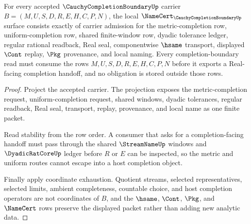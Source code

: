 \begin{theorem}
\label{thm:cauchy-completion-boundary-namecert-obligations}
For every accepted $\CauchyCompletionBoundaryUp$ carrier $B=(M,U,S,D,R,E,H,C,P,N)$, the local $\NameCert_{\CauchyCompletionBoundaryUp}$ surface consists exactly of carrier admission for the metric-completion row, uniform-completion row, shared finite-window row, dyadic tolerance ledger, regular rational readback, Real seal, componentwise $\hsame$ transport, displayed $\Cont$ replay, $\Pkg$ provenance, and local naming. Every completion-boundary read must consume the rows $M,U,S,D,R,E,H,C,P,N$ before it exports a Real-facing completion handoff, and no obligation is stored outside those rows.
\end{theorem}
\begin{proof}
Project the accepted carrier. The projection exposes the metric-completion request, uniform-completion request, shared windows, dyadic tolerances, regular readback, Real seal, transport, replay, provenance, and local name as one finite packet.

Read stability from the row order. A consumer that asks for a completion-facing handoff must pass through the shared $\StreamNameUp$ windows and $\DyadicRatCoreUp$ ledger before $R$ or $E$ can be inspected, so the metric and uniform routes cannot escape into a host completion object.

Finally apply coordinate exhaustion. Quotient streams, selected representatives, selected limits, ambient completeness, countable choice, and host completion operators are not coordinates of $B$, and the $\hsame$, $\Cont$, $\Pkg$, and $\NameCert$ rows preserve the displayed packet rather than adding new analytic data.
\end{proof}

